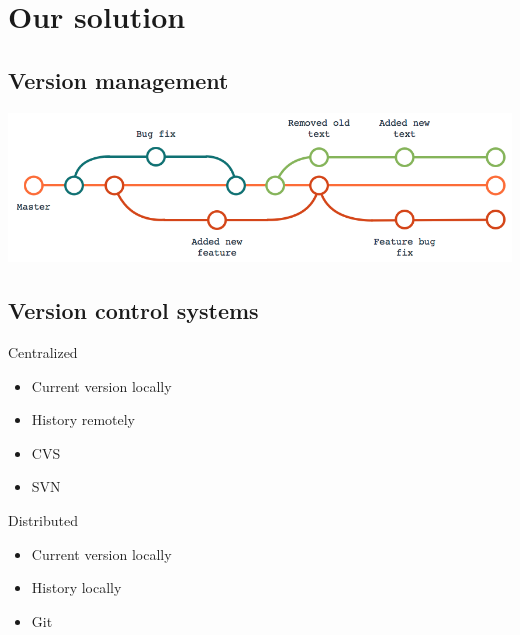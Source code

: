 \section{Our solution}

\subsection{Version management}

\begin{frame}
  \centering
  \includegraphics[width=\columnwidth]{figs/version-tree.png}
\end{frame}

\subsection{Version control systems}

\begin{frame}
  \begin{block}{Centralized}
    \begin{itemize}
      \item Current version locally
      \item History remotely
    \end{itemize}
  \end{block}

  \pause

  \begin{example}
    \begin{itemize}
      \item CVS
      \item SVN
    \end{itemize}
  \end{example}
\end{frame}

\begin{frame}
  \begin{block}{Distributed}
    \begin{itemize}
      \item Current version locally
      \item History locally
    \end{itemize}
  \end{block}

  \pause

  \begin{example}
    \begin{itemize}
      \item Git
    \end{itemize}
  \end{example}
\end{frame}

